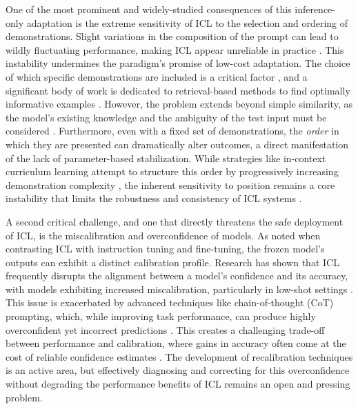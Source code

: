 \documentclass[11pt]{article}
\begin{document}
One of the most prominent and widely-studied consequences of this inference-only adaptation is the extreme sensitivity of ICL to the selection and ordering of demonstrations. Slight variations in the composition of the prompt can lead to wildly fluctuating performance, making ICL appear unreliable in practice \cite{ref32}. This instability undermines the paradigm's promise of low-cost adaptation. The choice of which specific demonstrations are included is a critical factor \cite{ref33,ref34}, and a significant body of work is dedicated to retrieval-based methods to find optimally informative examples \cite{ref19,ref35}. However, the problem extends beyond simple similarity, as the model's existing knowledge and the ambiguity of the test input must be considered \cite{ref36}. Furthermore, even with a fixed set of demonstrations, the \emph{order} in which they are presented can dramatically alter outcomes, a direct manifestation of the lack of parameter-based stabilization. While strategies like in-context curriculum learning attempt to structure this order by progressively increasing demonstration complexity \cite{ref21}, the inherent sensitivity to position remains a core instability that limits the robustness and consistency of ICL systems \cite{ref37}.

A second critical challenge, and one that directly threatens the safe deployment of ICL, is the miscalibration and overconfidence of models. As noted when contrasting ICL with instruction tuning and fine-tuning, the frozen model's outputs can exhibit a distinct calibration profile. Research has shown that ICL frequently disrupts the alignment between a model's confidence and its accuracy, with models exhibiting increased miscalibration, particularly in low-shot settings \cite{ref38}. This issue is exacerbated by advanced techniques like chain-of-thought (CoT) prompting, which, while improving task performance, can produce highly overconfident yet incorrect predictions \cite{ref38}. This creates a challenging trade-off between performance and calibration, where gains in accuracy often come at the cost of reliable confidence estimates \cite{ref39}. The development of recalibration techniques is an active area, but effectively diagnosing and correcting for this overconfidence without degrading the performance benefits of ICL remains an open and pressing problem.
\end{document}
